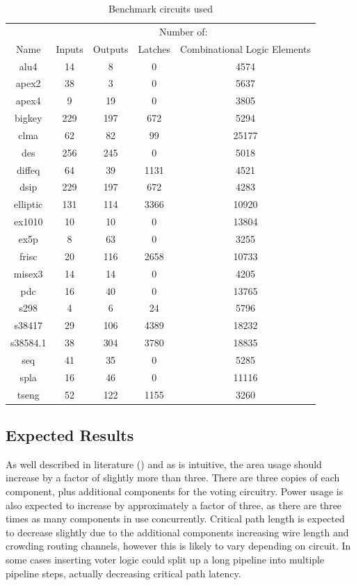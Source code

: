 \documentclass[12pt,drafta4paper,oneside]{memoir} %
\begin{document}
\begin{center}
    \begin{table}
        \begin{tabular}{c|cccc}
         & \multicolumn{4}{c}{Number of:}\\
         Name & Inputs & Outputs & Latches & Combinational Logic Elements\\
            alu4 & 14 & 8 & 0 & 4574\\
            apex2 & 38 & 3 & 0 & 5637\\
            apex4 & 9 & 19 & 0 & 3805\\
            bigkey & 229 & 197 & 672 & 5294\\
            clma & 62 & 82 & 99 & 25177\\
            des & 256 & 245 & 0 & 5018\\
            diffeq & 64 & 39 & 1131 & 4521\\
            dsip & 229 & 197 & 672 & 4283\\
            elliptic & 131 & 114 & 3366 & 10920\\
            ex1010 & 10 & 10 & 0 & 13804\\
            ex5p & 8 & 63 & 0 & 3255\\
            frisc & 20 & 116 & 2658 & 10733\\
            misex3 & 14 & 14 & 0 & 4205\\
            pdc & 16 & 40 & 0 & 13765\\
            s298     & 4 & 6 & 24 & 5796\\
            s38417   & 29 & 106 & 4389 & 18232\\
            s38584.1 & 38 & 304 & 3780 & 18835\\
            seq      & 41 & 35 & 0 & 5285\\
            spla     & 16 & 46 & 0 & 11116\\
            tseng    & 52 & 122 & 1155 & 3260
        \end{tabular}
        \caption{Benchmark circuits used}
        \label{benchmarkList}
    \end{table}
\end{center}
\subsection{Expected Results}
As well described in literature (\cite{HardeningTechniques}) and as is intuitive, the area usage should increase by a factor of slightly more than three. There are three copies of each component, plus additional components for the voting circuitry. Power usage is also expected to increase by approximately a factor of three, as there are three times as many components in use concurrently. Critical path length is expected to decrease slightly due to the additional components increasing wire length and crowding routing channels, however this is likely to vary depending on circuit. In some cases inserting voter logic could split up a long pipeline into multiple pipeline steps, actually decreasing critical path latency.
\end{document}
